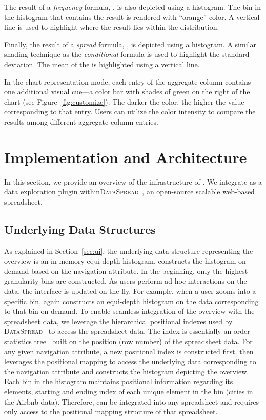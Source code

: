  The result of a \emph{frequency} formula,
\eg {}, is also depicted using a histogram.
The bin in the histogram
that contains the result is rendered with ``orange'' color.
A vertical line is used to highlight
where the result lies within the distribution.

 Finally, the result of a \emph{spread} formula,
\eg {}, is depicted using a histogram.
A similar shading technique as the \emph{conditional} formula is used to highlight the standard deviation. The mean of the is highlighted using a vertical line.

In the chart representation mode,
each entry of the aggregate column
contains one additional visual cue---a color bar
with shades of green on
the right of the chart (see Figure~\ref{fig:customize}).
The darker the color, the higher the value corresponding to that entry. 
Users can utilize the color intensity
to compare the results among different aggregate column entries.

\section{Implementation and  Architecture}
\label{sec:sys}
In this section, we provide an overview of the infrastructure of \noah. 
We integrate \noah as a data exploration plugin within{\scshape DataSpread}~\cite{dataspread}, 
an open-source scalable web-based spreadsheet.

\subsection{Underlying Data Structures}
As explained in Section~\ref{sec:ui}, the underlying data structure representing the overview is an in-memory equi-depth histogram. 
\noah constructs the histogram on demand based on the navigation attribute. 
In the beginning, only the highest granularity bins are constructed. 
As users perform ad-hoc interactions on the data, the interface is updated on the fly. 
For example, when a user zooms into a specific bin, 
\noah again constructs an equi-depth histogram 
on the data corresponding to that bin on demand.
To enable seamless integration of the overview 
with the spreadsheet data, we leverage the hierarchical positional indexes
used by {\scshape DataSpread}~\cite{datamodels} to access
the spreadsheet data. 
The index is essentially an
order statistics tree~\cite{datamodels} 
built on the position (\eg row number) of the spreadsheet data. 
For any given navigation attribute, a new positional index is constructed first. 
\noah then leverages the positional mapping to access the underlying data corresponding to the navigation attribute and constructs the histogram depicting the overview. 
Each bin in the histogram maintains positional information regarding its elements, \ie starting and ending index of each unique element in the bin (\eg cities in the Airbnb data).  
Therefore, \noah can be integrated into any 
spreadsheet and requires only access to the positional mapping structure of that spreadsheet.

